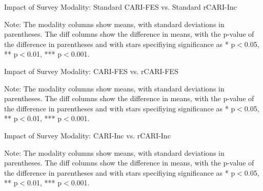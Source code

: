 \documentclass[11pt,harvard]{article}
\begin{document}
\begin{table}[htbp]
	\centering
	\begin{adjustbox}{max width=\textwidth}
		\begin{threeparttable}
			\caption{Impact of Survey Modality: Standard CARI-FES vs. Standard rCARI-Inc}
			\scriptsize
			 
			\label{tab:CARI_rCARI_Modality_All_Country}
			\begin{tablenotes}
				\item  Note: The modality columns show means, with standard deviations in parentheses. The diff columns show the difference in means, with the p-value of the difference in parentheses and with stars specifiying significance as * p$<$0.05, ** p$<$0.01, *** p$<$0.001. 
			\end{tablenotes}
		\end{threeparttable}
	\end{adjustbox}
\end{table}

\begin{table}[htbp]
	\centering
	\begin{adjustbox}{max width=\textwidth}
		\begin{threeparttable}
			\caption{Impact of Survey Modality: CARI-FES vs. rCARI-FES}
			\scriptsize
			 
			\label{tab:CARI_FES_rCARI_Modality_All_Country}
			\begin{tablenotes}
				\item Note: The modality columns show means, with standard deviations in parentheses. The diff columns show the difference in means, with the p-value of the difference in parentheses and with stars specifiying significance as * p$<$0.05, ** p$<$0.01, *** p$<$0.001. 
			\end{tablenotes}
		\end{threeparttable}
	\end{adjustbox}
\end{table}

\begin{table}[htbp]
	\centering
	\begin{adjustbox}{max width=\textwidth}
		\begin{threeparttable}
			\caption{Impact of Survey Modality: CARI-Inc vs. rCARI-Inc}
			\scriptsize
			 
			\label{tab:Inc_CARI_rCARI_Modality_All_Country}
			\begin{tablenotes}
				\item Note: The modality columns show means, with standard deviations in parentheses. The diff columns show the difference in means, with the p-value of the difference in parentheses and with stars specifiying significance as * p$<$0.05, ** p$<$0.01, *** p$<$0.001. 
			\end{tablenotes}
		\end{threeparttable}
	\end{adjustbox}
\end{table}

\pagebreak
\end{document}
